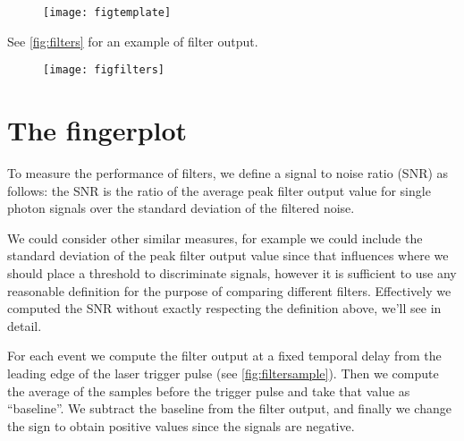 \begin{figure}
    \hspace{0.00\textwidth}
    \texttt{[image: figtemplate]}
    

\end{figure}

See \autoref{fig:filters} for an example of filter output.

\begin{figure}
    \hspace{0.00\textwidth}
    \texttt{[image: figfilters]}
    

\end{figure}

\section{The fingerplot}
\label{sec:fingerplot}

To measure the performance of filters, we define a signal to noise ratio (SNR)
as follows: the SNR is the ratio of the average peak filter output value for
single photon signals over the standard deviation of the filtered noise.

We could consider other similar measures, for example we could include the
standard deviation of the peak filter output value since that influences where
we should place a threshold to discriminate signals, however it is sufficient
to use any reasonable definition for the purpose of comparing different
filters. Effectively we computed the SNR without exactly respecting the
definition above, we'll see in detail.

For each event we compute the filter output at a fixed temporal delay from the
leading edge of the laser trigger pulse (see \autoref{fig:filtersample}).
Then we compute the average of the samples before the trigger pulse and take
that value as ``baseline''. We subtract the baseline from the filter output,
and finally we change the sign to obtain positive values since the signals are
negative.

